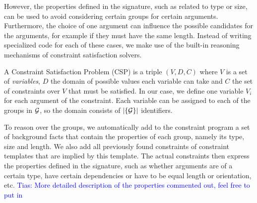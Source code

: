 \documentclass{sig-alternate-05-2015}
\newcommand{\tias}[1]{\textcolor{blue}{{\sc Tias:} #1}\xspace}
\newcommand{\format}[1]{\textit{#1}\xspace}
\newcommand{\template}{\format{constraint template}}
\newcommand{\CSignature}{Signature\xspace}
\newcommand{\groups}{\ensuremath{\mathcal{G}}\xspace}
\begin{document}
However, the properties defined in the signature, such as related to type or size, can be used to avoid considering certain groups for certain arguments. Furthermore, the choice of one argument can influence the possible candidates for the arguments, for example if they must have the same length. Instead of writing specialized code for each of these cases, we make use of the built-in reasoning mechanisms of constraint satisfaction solvers.


A Constraint Satisfaction Problem (CSP) is a triple $(V,D,C)$ where $V$ is a set of \textit{variables}, $D$ the domain of possible values each variable can take and $C$ the set of constraints over $V$ that must be satisfied. In our case, we define one variable $V_i$ for each argument of the constraint. Each variable can be assigned to each of the groups in ${\cal G}$, so the domain consists of $|\{\cal G\}|$ identifiers.

To reason over the groups, we automatically add to the constraint program a set of background facts that contain the properties of each group, namely its type, size and length. We also add all previously found constraints of constraint templates that are implied by this template. The actual constraints then express the properties defined in the signature, such as whether arguments are of a certain type, have certain dependencies or have to be equal length or orientation, etc.
\tias{More detailed description of the properties commented out, feel free to put in}
\end{document}
